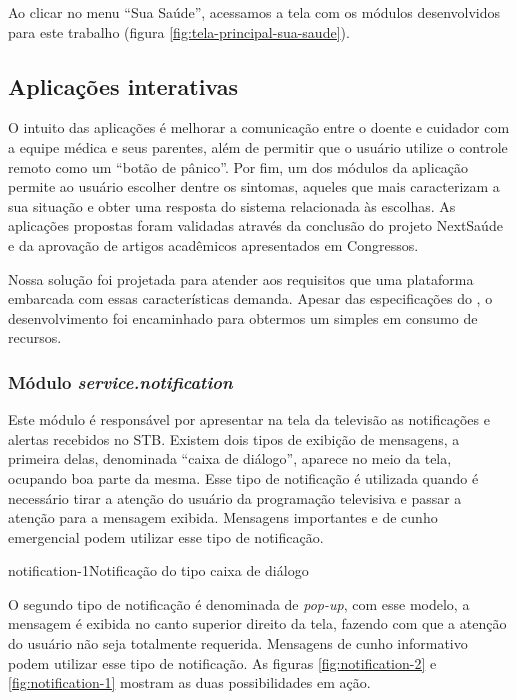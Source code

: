 Ao clicar no menu ``Sua Saúde'', acessamos a tela com os módulos desenvolvidos
para este trabalho (figura \ref{fig:tela-principal-sua-saude}). 


\subsection{Aplicações interativas} \label{subsec:aplicacoes-tv-health}

O intuito das aplicações é melhorar a comunicação entre o doente e cuidador com
a equipe médica e seus parentes, além de permitir que o usuário utilize o
controle remoto como um ``botão de pânico''. Por fim, um dos módulos da
aplicação permite ao usuário escolher dentre os sintomas, aqueles que mais
caracterizam a sua situação e obter uma resposta do sistema relacionada às
escolhas. As aplicações  propostas foram validadas através da conclusão do
projeto NextSaúde e da aprovação de artigos acadêmicos apresentados em
Congressos.

Nossa solução foi projetada para atender aos requisitos que uma plataforma
embarcada com essas características demanda. Apesar das especificações do
\hardware[], o desenvolvimento foi encaminhado para obtermos um \software[]
simples em consumo de recursos.

\subsubsection{Módulo \textit{service.notification}}\label{subsubsec:notification}

Este módulo é responsável por apresentar na tela da televisão as notificações e
alertas recebidos no STB. Existem dois tipos de exibição de mensagens, a
primeira delas, denominada ``caixa de diálogo'', aparece no meio da tela,
ocupando boa parte da mesma. Esse tipo de notificação é utilizada quando é
necessário tirar a atenção do usuário da programação televisiva e passar a
atenção para a mensagem exibida. Mensagens importantes e de cunho emergencial
podem utilizar esse tipo de notificação.   

{notification-1}{Notificação do tipo caixa de diálogo}

O segundo tipo de notificação é denominada de \textit{pop-up}, com esse modelo,
a mensagem é exibida no canto superior direito da tela, fazendo com que a
atenção do usuário não seja totalmente requerida. Mensagens de cunho informativo
podem utilizar esse tipo de notificação. As figuras \ref{fig:notification-2} e
\ref{fig:notification-1}  mostram as duas possibilidades em ação.

